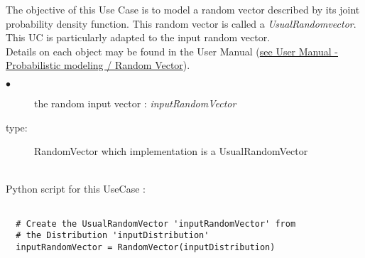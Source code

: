 \renewcommand{\filename}{docUC_InputNoData_InputRandomVector.tex}
\renewcommand{\filetitle}{UC : Creation  of the random input vector from a distribution}

\HeaderIIILevel


\label{UsualRandomVector}



The objective of this Use Case is to model a random  vector described by its joint probability density function. This random vector is called a {\itshape UsualRandomvector}. This UC is particularly adapted to the input random vector.\\

Details on each object may be found in the User Manual  (\href{OpenTURNS_UserManual_TUI.pdf}{see User Manual - Probabilistic modeling / Random Vector}).\\

\noindent%
{
  \begin{description}
  \item[$\bullet$] the random input vector : {\itshape inputRandomVector}
  \item[type:] RandomVector which implementation is a UsualRandomVector
  \end{description}
}

\textspace\\
Python script for this UseCase :


\begin{lstlisting}

  # Create the UsualRandomVector 'inputRandomVector' from
  # the Distribution 'inputDistribution'
  inputRandomVector = RandomVector(inputDistribution)
\end{lstlisting}



